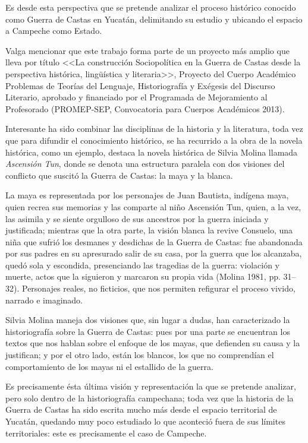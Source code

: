 Es desde esta perspectiva que se pretende analizar el proceso histórico
conocido como Guerra de Castas en Yucatán, delimitando su estudio y
ubicando el espacio a  Campeche como Estado.
 
Valga mencionar que este trabajo forma parte de un proyecto más amplio que
lleva por título <<La construcción Sociopolítica en la Guerra de Castas
desde la perspectiva histórica, lingüística y literaria>>, Proyecto
del Cuerpo Académico Problemas de Teorías del Lenguaje, Historiografía  y
Exégesis del Discurso Literario, aprobado y financiado por el Programada de
Mejoramiento al Profesorado (PROMEP-SEP, Convocatoria para Cuerpos
Académicos 2013). 


Interesante ha sido combinar las disciplinas de la historia y la literatura,
toda vez que para difundir el conocimiento histórico, se ha recurrido a la
obra de la novela histórica, como un ejemplo, destaca la  novela histórica
de Silvia Molina llamada \textit{Ascensión Tun},  donde se denota
una estructura paralela con dos visiones del conflicto que suscitó la
Guerra de Castas: la maya y la blanca. 

La maya es representada
por los personajes de Juan Bautista, indígena maya, quien recrea sus
memorias y las comparte al niño Ascensión Tun, quien, a la vez, las
asimila y se siente orgulloso de sus ancestros por la guerra iniciada y
justificada; mientras que la otra parte, la
visión blanca la revive
Consuelo, una niña que sufrió los desmanes y desdichas de la Guerra de
Castas: fue abandonada por sus padres en su apresurado salir de su casa,
por la guerra que los alcanzaba, quedó sola y escondida, presenciando las
tragedias de la guerra: violación y muerte, actos que la siguieron  y
marcaron su propia vida (Molina 1981, pp. 31--32). Personajes reales, no
ficticios, que nos permiten refigurar el proceso vivido, narrado e
imaginado.
\enlargethispage{1\baselineskip}

Silvia Molina maneja dos
visiones que, sin lugar a dudas, han  caracterizado la historiografía sobre
la Guerra de Castas: pues por una parte se encuentran los textos que nos
hablan sobre el enfoque de los mayas, que defienden su causa y la
justifican; y por el otro lado, están los blancos, los que no comprendían
el comportamiento de los mayas ni el estallido de la guerra.

Es precisamente ésta última visión y representación la que se pretende
analizar, pero solo dentro de la historiografía campechana; toda vez  que
la historia de la Guerra de Castas ha sido escrita mucho más desde el
espacio territorial de Yucatán, quedando muy poco estudiado lo que
aconteció fuera de sus límites territoriales: este es precisamente el caso
de Campeche.


